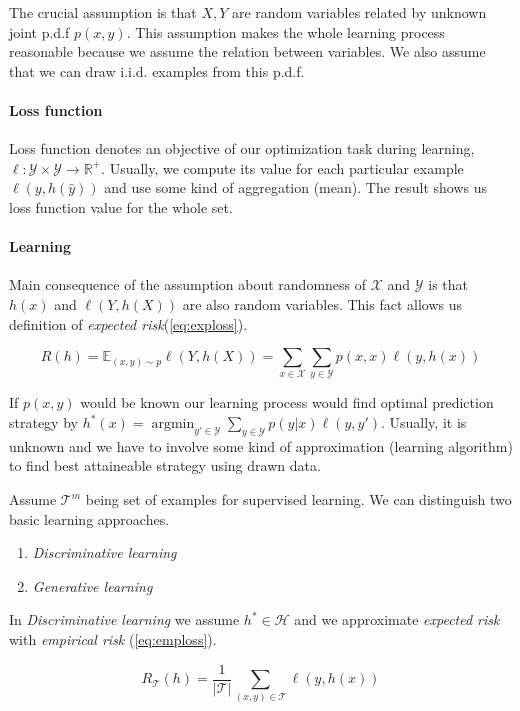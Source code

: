The crucial assumption is that $X, Y$ are random variables related by unknown joint p.d.f $p(x,y)$. This assumption makes the whole learning process reasonable because we assume the relation between variables. We also assume that we can draw i.i.d. examples from this p.d.f.

\paragraph{Loss function}
Loss function denotes an objective of our optimization task during learning, $\ell: \mathcal{Y} \times \mathcal{Y} \rightarrow \mathbb{R}^{+}$. Usually, we compute its value for each particular example $\ell(y, h(\hat{y}))$ and use some kind of aggregation (mean). The result shows us loss function value for the whole set.

\paragraph{Learning}
Main consequence of the assumption about randomness of $\mathcal{X}$ and $\mathcal{Y}$ is that $h(x)$ and $\ell(Y,h(X))$ are also random variables. This fact allows us definition of \emph{expected risk}(\ref{eq:exploss}).

\begin{equation} \label{eq:exploss}
    R(h)=\mathbb{E}_{(x,y) \sim p}\ell(Y,h(X))=\sum_{x \in \mathcal{X}}\sum_{y \in \mathcal{Y}}p(x,x)\ell(y,h(x))
\end{equation}

If $p(x,y)$ would be known our learning process would find optimal prediction strategy by $h^*(x)=\operatorname*{argmin}_{{y}'\in \mathcal{Y}}\sum_{y\in\mathcal{Y}}p(y|x)\ell(y,{y}')$. Usually, it is unknown and we have to involve some kind of approximation (learning algorithm) to find best attaineable strategy using drawn data.

Assume $\mathcal{T}^m$ being set of examples for supervised learning. We can distinguish two basic learning approaches.
\begin{enumerate}
    \item \emph{Discriminative learning}
    \item \emph{Generative learning}
\end{enumerate}

In \emph{Discriminative learning} we assume $h^* \in \mathcal{H}$ and we approximate \emph{expected risk} with \emph{empirical risk} (\ref{eq:emploss}).

\begin{equation} \label{eq:emploss}
    R_{\mathcal{T}}(h)= \frac{1}{|\mathcal{T}|} \sum_{(x,y) \in \mathcal
    T}\ell(y,h(x))
\end{equation}

